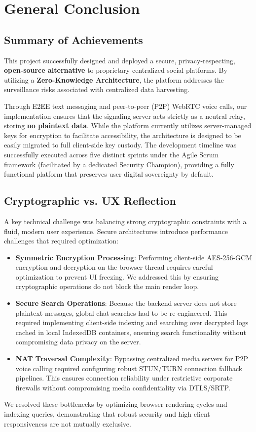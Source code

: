 
\chapter*{General Conclusion}

\section*{Summary of Achievements}
This project successfully designed and deployed a secure, privacy-respecting, \textbf{open-source alternative} to proprietary centralized social platforms. By utilizing a \textbf{Zero-Knowledge Architecture}, the platform addresses the surveillance risks associated with centralized data harvesting. 

Through E2EE text messaging and peer-to-peer (P2P) WebRTC voice calls, our implementation ensures that the signaling server acts strictly as a neutral relay, storing \textbf{no plaintext data}. While the platform currently utilizes server-managed keys for encryption to facilitate accessibility, the architecture is designed to be easily migrated to full client-side key custody. The development timeline was successfully executed across five distinct sprints under the Agile Scrum framework (facilitated by a dedicated Security Champion), providing a fully functional platform that preserves user digital sovereignty by default.

\section*{Cryptographic vs. UX Reflection}
A key technical challenge was balancing strong cryptographic constraints with a fluid, modern user experience. Secure architectures introduce performance challenges that required optimization:
\begin{itemize}
    \item \textbf{Symmetric Encryption Processing}: Performing client-side AES-256-GCM encryption and decryption on the browser thread requires careful optimization to prevent UI freezing. We addressed this by ensuring cryptographic operations do not block the main render loop.
    \item \textbf{Secure Search Operations}: Because the backend server does not store plaintext messages, global chat searches had to be re-engineered. This required implementing client-side indexing and searching over decrypted logs cached in local IndexedDB containers, ensuring search functionality without compromising data privacy on the server.
    \item \textbf{NAT Traversal Complexity}: Bypassing centralized media servers for P2P voice calling required configuring robust STUN/TURN connection fallback pipelines. This ensures connection reliability under restrictive corporate firewalls without compromising media confidentiality via DTLS/SRTP.
\end{itemize}
We resolved these bottlenecks by optimizing browser rendering cycles and indexing queries, demonstrating that robust security and high client responsiveness are not mutually exclusive.

